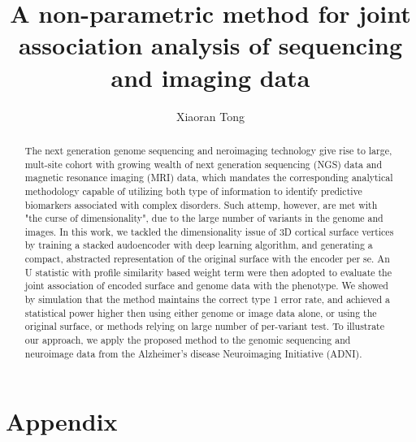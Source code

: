 \documentclass[12pt]{article}
\author{Xiaoran Tong}
\begin{document}
\title{A non-parametric method for joint association analysis of
  sequencing and imaging data}
\maketitle

\begin{abstract}
  The next generation genome sequencing and neroimaging technology
  give rise to large, mult-site cohort with growing wealth of next
  generation sequencing (NGS) data and magnetic resonance imaging
  (MRI) data, which mandates the corresponding analytical methodology
  capable of utilizing both type of information to identify predictive
  biomarkers associated with complex disorders. Such attemp, however,
  are met with "the curse of dimensionality", due to the large number
  of variants in the genome and images. In this work, we tackled the
  dimensionality issue of 3D cortical surface vertices by training a
  stacked audoencoder with deep learning algorithm, and generating a
  compact, abstracted representation of the original surface with the
  encoder per se. An U statistic with profile similarity based weight
  term were then adopted to evaluate the joint association of encoded
  surface and genome data with the phenotype. We showed by simulation
  that the method maintains the correct type 1 error rate, and
  achieved a statistical power higher then using either genome or
  image data alone, or using the original surface, or methods relying
  on large number of per-variant test. To illustrate our approach, we
  apply the proposed method to the genomic sequencing and neuroimage
  data from the Alzheimer's disease Neuroimaging Initiative (ADNI).
\end{abstract}







\section{Appendix}


\printbibheading
\printbibliography
\end{document}
